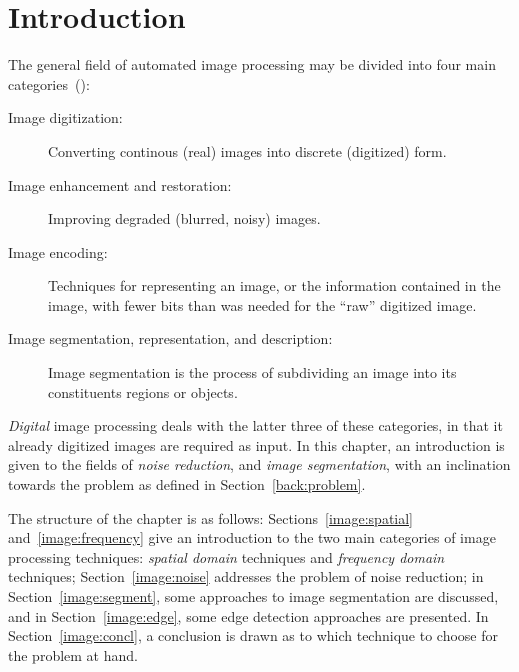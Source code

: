 
\section{Introduction}
\label{image:intro}

The general field of automated image processing may be divided into
four main categories~(\cite{digim}):

\begin{description}
\item[Image digitization:] Converting continous (real) images into
  discrete (digitized) form.
\item[Image enhancement and restoration:] Improving degraded (blurred,
  noisy) images.
\item[Image encoding:] Techniques for representing an image, or the
  information contained in the image, with fewer bits than was needed
  for the ``raw'' digitized image.
\item[Image segmentation, representation, and description:] Image
  segmentation is the process of subdividing an image into its
  constituents regions or objects.
\end{description}

{\em Digital\/} image processing deals with the latter three of these
categories, in that it already digitized images are required as input.
In this chapter, an introduction is given to the fields of {\em noise
  reduction\/}, and {\em image segmentation\/}, with an inclination
towards the problem as defined in Section~\ref{back:problem}.

The structure of the chapter is as follows:
Sections~\ref{image:spatial} and~\ref{image:frequency} give an
introduction to the two main categories of image processing
techniques: {\em spatial domain\/} techniques and {\em frequency
  domain\/} techniques; Section~\ref{image:noise} addresses the
problem of noise reduction; in Section~\ref{image:segment}, some
approaches to image segmentation are discussed, and in
Section~\ref{image:edge}, some edge detection approaches are
presented.  In Section~\ref{image:concl}, a conclusion is drawn as to
which technique to choose for the problem at hand.
